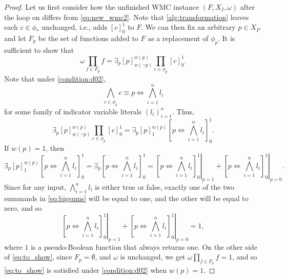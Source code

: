 \documentclass[runningheads]{llncs}
\begin{document}
\begin{proof}
  Let us first consider how the unfinished WMC instance $(F, X_I, \omega)$ after
  the loop on  differs from
  \eqref{eq:new_wmc2}. Note that \cref{alg:transformation} leaves each $c \in
  \phi_*$ unchanged, i.e., adds $[c]_0^1$ to $F$. We can then fix an arbitrary
  $p \in X_P$ and let $F_p$ be the set of functions added to $F$ as a
  replacement of $\phi_p$. It is sufficient to show that
  \begin{equation} \label{eq:to_show}
    \omega \prod_{f \in F_p} f = \exists_p [p]_{w(\neg p)}^{w(p)} \prod_{c \in \phi_p} [c]_0^1.
  \end{equation}
  Note that under \cref{condition:d02},
  \[
    \bigwedge_{c \in \phi_p} c \equiv p \Leftrightarrow \bigwedge_{i=1}^n l_i
  \]
  for some family of indicator variable literals $(l_i)_{i=1}^n$. Thus,
  \[
    \exists_p [p]_{w(\neg p)}^{w(p)} \prod_{c \in \phi_p} [c]_0^1 = \exists_p
    [p]_1^{w(p)} \left[ p \Leftrightarrow \bigwedge_{i=1}^n l_i \right]_0^1.
  \]
  If $w(p) = 1$, then
  \begin{equation} \label{eq:bigsums}
    \exists_p [p]_1^{w(p)} \left[ p \Leftrightarrow \bigwedge_{i=1}^n l_i
    \right]_0^1 = \exists_p \left[ p \Leftrightarrow \bigwedge_{i=1}^n l_i
    \right]_0^1 = \left.\left[ p \Leftrightarrow \bigwedge_{i=1}^n l_i
    \right]_0^1\right|_{p=1} + \left.\left[ p \Leftrightarrow \bigwedge_{i=1}^n
      l_i \right]_0^1\right|_{p=0}.
  \end{equation}
  Since for any input, $\bigwedge_{i=1}^n l_i$ is either true or false, exactly
  one of the two summands in \cref{eq:bigsums} will be equal to one, and the
  other will be equal to zero, and so
  \[
    \left.\left[ p \Leftrightarrow \bigwedge_{i=1}^n l_i
      \right]_0^1\right|_{p=1} + \left.\left[ p \Leftrightarrow \bigwedge_{i=1}^n
        l_i \right]_0^1\right|_{p=0} = 1,
  \]
  where $1$ is a pseudo-Boolean function that always returns one. On the other
  side of \cref{eq:to_show}, since $F_p = \emptyset$, and $\omega$ is unchanged,
  we get $\omega\prod_{f \in F_p} f = 1$, and so \cref{eq:to_show} is satisfied
  under \cref{condition:d02} when $w(p) = 1$.


\end{proof}
\end{document}
